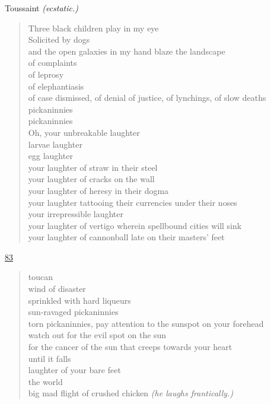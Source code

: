 \documentclass[letterpaper,article,12pt,oneside,notitlepage]{memoir}
\begin{document}
\begin{center}Toussaint \textit{(ecstatic.)}\end{center}

\begin{verse}
Three black children play in my eye \\
Solicited by dogs \\
and the open galaxies in my hand blaze the landscape \\
of complaints \\
of leprosy \\
of elephantiasis \\
of case dismissed, of denial of justice, of lynchings, of slow deaths \\
pickaninnies \\
pickaninnies \\
Oh, your unbreakable laughter \\
larvae laughter \\
egg laughter \\
your laughter of straw in their steel \\
your laughter of cracks on the wall \\
your laughter of heresy in their dogma \\
your laughter tattooing their currencies under their noses \\
your irrepressible laughter \\
your laughter of vertigo wherein spellbound cities will sink \\
your laughter of cannonball late on their masters' feet \\
\end{verse}

\clearpage

\href{http://cesaire.elotroalex.com/chiens/chiens/p083.html}{83}

\begin{verse}
toucan \\
wind of disaster \\
sprinkled with hard liqueurs \\
sun-ravaged pickaninnies \\
torn pickaninnies, pay attention to the sunspot on your forehead \\
watch out for the evil spot on the sun \\
for the cancer of the sun that creeps towards your heart \\
until it falls \\
laughter of your bare feet \\
the world \\
big mad flight of crushed chicken \textit{(he laughs frantically.)} \\
\end{verse}
\end{document}
